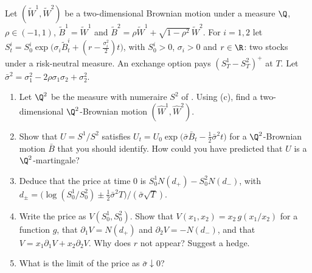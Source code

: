 \begin{exercise}\label{ex:rn-exchange}
\hard Let $(\widetilde W^1,\widetilde W^2)$ be a two-dimensional Brownian motion under a
measure $\Q$, $\rho\in(-1,1)$, $\widetilde B^1=\widetilde W^1$ and
$\widetilde B^2=\rho\widetilde W^1+\sqrt{1-\rho^2}\,\widetilde W^2$. For $i=1,2$ let
$S^i_t=S^i_0\exp\big(\sigma_i\widetilde B^i_t+(r-\frac{\sigma_i^2}2)t\big)$, with $S^i_0>0$,
$\sigma_i>0$ and $r\in\R$: two stocks under a risk-neutral measure. An exchange option pays
$(S^1_T-S^2_T)^+$ at $T$. Let $\bar\sigma^2=\sigma_1^2-2\rho\sigma_1\sigma_2+\sigma_2^2$.
\begin{enumerate}[label=(\alph*)]
  \item Let $\Q^2$ be the measure with numeraire $S^2$ of . Using
    (c), find a two-dimensional $\Q^2$-Brownian motion
    $(\widehat W^1,\widehat W^2)$.
  \item Show that $U=S^1/S^2$ satisfies $U_t=U_0\exp\big(\bar\sigma\bar B_t-\frac12\bar\sigma^2t\big)$
    for a $\Q^2$-Brownian motion $\bar B$ that you should identify. How could you have
    predicted that $U$ is a $\Q^2$-martingale?
  \item Deduce that the price at time $0$ is $S^1_0N(d_+)-S^2_0N(d_-)$, with
    $d_\pm=\big(\log(S^1_0/S^2_0)\pm\frac12\bar\sigma^2T\big)/(\bar\sigma\sqrt T)$.
  \item Write the price as $V(S^1_0,S^2_0)$. Show that $V(x_1,x_2)=x_2\,g(x_1/x_2)$ for a
    function $g$, that $\partial_1V=N(d_+)$ and $\partial_2V=-N(d_-)$, and that
    $V=x_1\partial_1V+x_2\partial_2V$. Why does $r$ not appear? Suggest a hedge.
  \item What is the limit of the price as $\bar\sigma\downarrow0$?
\end{enumerate}
\end{exercise}

